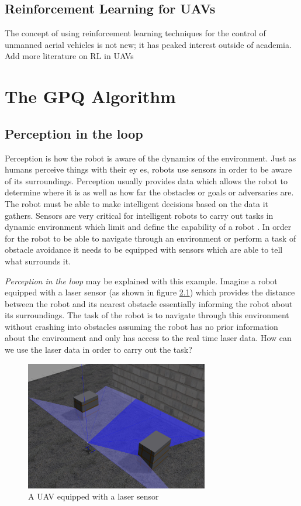 \documentclass[12pt]{report}
\begin{document}
\section{Reinforcement Learning for UAVs}
The concept of using reinforcement learning techniques for the control of unmanned aerial
vehicles is not new; it has peaked interest outside of academia. {\color{red}Add more literature on RL in UAVs}


\chapter{The GPQ Algorithm} %

\label{gpq} %
\section{Perception in the loop}
 
 Perception is how the robot is aware of the dynamics of the environment. Just as humans perceive things with their ey es, robots use sensors in order to be aware of its surroundings. Perception usually provides data which allows the robot to determine where it is as well as how far the obstacles or goals or adversaries are. The robot must be able to make intelligent decisions based on the data it gathers. Sensors are very critical for intelligent robots to carry out tasks in dynamic environment which limit and define the capability of a robot \cite{tokekar2014placement}. In order for the robot to be able to navigate through an environment or perform a task of obstacle avoidance it needs to be equipped with sensors which are able to tell what surrounds it.\par 
\textit{Perception in the loop} may be explained with this example. Imagine a robot equipped with a laser sensor (as shown in figure \ref{fig:perception_example}) which provides the distance between the robot and its nearest obstacle essentially informing the robot about its surroundings. The task of the robot is to navigate through this environment without crashing into obstacles assuming the robot has no prior information about the environment and only has access to the real time laser data. How can we use the laser data in order to carry out the task?
\begin{figure}[H]
	\centering
	\includegraphics[width=8cm]{perception_1.pdf}
	\caption {A UAV equipped with a laser sensor}
   \label{fig:perception_example}
\end{figure}
\end{document}
